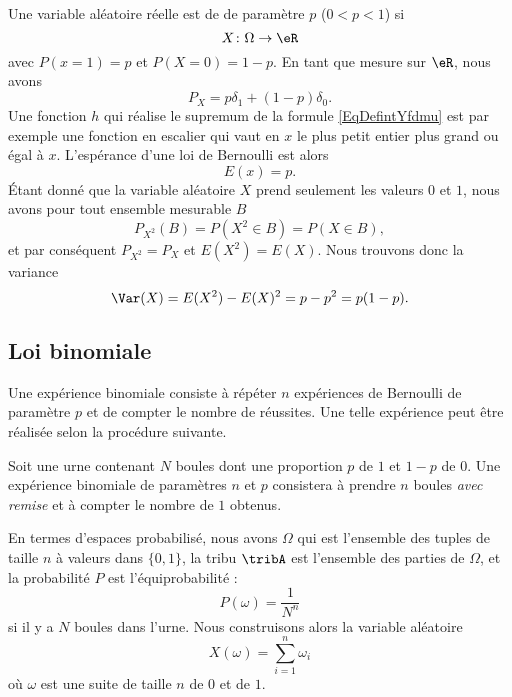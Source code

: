 Une variable aléatoire réelle est de  de paramètre \( p\) (\( 0<p<1\)) si
\begin{equation}
	X\colon \Omega\to \eR
\end{equation}
avec \( P(x=1)=p\) et \( P(X=0)=1-p\). En tant que mesure sur \( \eR\), nous avons
\begin{equation}
	P_X=p\delta_1+(1-p)\delta_0.
\end{equation}
Une fonction \( h\) qui réalise le supremum de la formule \eqref{EqDefintYfdmu} est par exemple une fonction en escalier qui vaut en \( x\) le plus petit entier plus grand ou égal à \( x\). L'espérance d'une loi de Bernoulli est alors
\begin{equation}
	E(x)=p.
\end{equation}
Étant donné que la variable aléatoire \( X\) prend seulement les valeurs \( 0\) et \( 1\), nous avons pour tout ensemble mesurable \( B\)
\begin{equation}
	P_{X^2}(B)=P(X^2\in B)=P(X\in B),
\end{equation}
et par conséquent \( P_{X^2}=P_X\) et \( E(X^2)=E(X)\). Nous trouvons donc la variance
\begin{equation}        \label{EqVarBern}
	\Var(X)=E(X^2)-E(X)^2=p-p^2=p(1-p).
\end{equation}

\subsection{Loi binomiale}

Une expérience binomiale consiste à répéter \( n\) expériences de Bernoulli de paramètre \( p\) et de compter le nombre de réussites. Une telle expérience peut être réalisée selon la procédure suivante.

Soit une urne contenant \( N\) boules dont une proportion \( p\) de \( 1\) et \( 1-p\) de \( 0\). Une expérience binomiale de paramètres \( n\) et \( p\) consistera à prendre \( n\) boules \emph{avec remise} et à compter le nombre de \( 1\) obtenus.

En termes d'espaces probabilisé, nous avons \( \Omega\) qui est l'ensemble des tuples de taille \( n\) à valeurs dans \( \{ 0,1 \}\), la tribu \( \tribA\) est l'ensemble des parties de \( \Omega\), et la probabilité \( P\) est l'équiprobabilité :
\begin{equation}
	P(\omega)=\frac{1}{ N^n }
\end{equation}
si il y a \( N\) boules dans l'urne. Nous construisons alors la variable aléatoire
\begin{equation}
	X(\omega)=\sum_{i=1}^n\omega_i
\end{equation}
où \( \omega\) est une suite de taille \( n\) de \( 0\) et de \( 1\).

